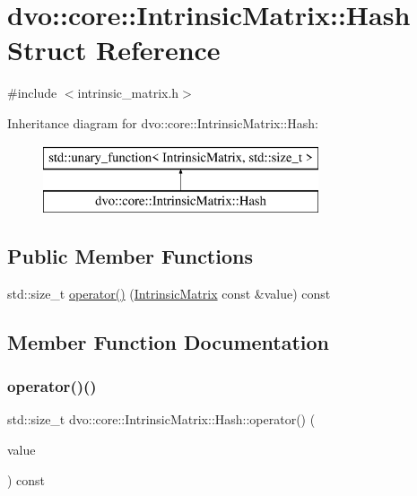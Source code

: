 \hypertarget{structdvo_1_1core_1_1_intrinsic_matrix_1_1_hash}{}\section{dvo\+:\+:core\+:\+:Intrinsic\+Matrix\+:\+:Hash Struct Reference}
\label{structdvo_1_1core_1_1_intrinsic_matrix_1_1_hash}


{\ttfamily \#include $<$intrinsic\+\_\+matrix.\+h$>$}

Inheritance diagram for dvo\+:\+:core\+:\+:Intrinsic\+Matrix\+:\+:Hash\+:\begin{figure}[H]
\begin{center}
\leavevmode
\includegraphics[height=2.000000cm]{structdvo_1_1core_1_1_intrinsic_matrix_1_1_hash}
\end{center}
\end{figure}
\subsection*{Public Member Functions}
\begin{DoxyCompactItemize}
\item 
std\+::size\+\_\+t \mbox{\hyperlink{structdvo_1_1core_1_1_intrinsic_matrix_1_1_hash_a1618ad126d9e78c43c51d9e87dbb6973}{operator()}} (\mbox{\hyperlink{structdvo_1_1core_1_1_intrinsic_matrix}{Intrinsic\+Matrix}} const \&value) const
\end{DoxyCompactItemize}


\subsection{Member Function Documentation}
\mbox{\label{structdvo_1_1core_1_1_intrinsic_matrix_1_1_hash_a1618ad126d9e78c43c51d9e87dbb6973}} 
\subsubsection{\texorpdfstring{operator()()}{operator()()}}
{\footnotesize\ttfamily std\+::size\+\_\+t dvo\+::core\+::\+Intrinsic\+Matrix\+::\+Hash\+::operator() (\begin{DoxyParamCaption}\item[{\mbox{\hyperlink{structdvo_1_1core_1_1_intrinsic_matrix}{Intrinsic\+Matrix}} const \&}]{value }\end{DoxyParamCaption}) const}



